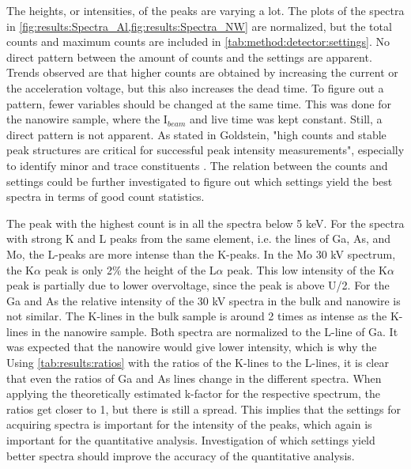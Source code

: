 The heights, or intensities, of the peaks are varying a lot.
The plots of the spectra in \cref{fig:results:Spectra_Al,fig:results:Spectra_NW} are normalized, but the total counts and maximum counts are included in \cref{tab:method:detector:settings}.
No direct pattern between the amount of counts and the settings are apparent.
Trends observed are that higher counts are obtained by increasing the current or the acceleration voltage, but this also increases the dead time.
To figure out a pattern, fewer variables should be changed at the same time.
This was done for the nanowire sample, where the I$_{beam}$ and live time was kept constant.
Still, a direct pattern is not apparent.
As stated in Goldstein, "high counts and stable peak structures are critical for successful peak intensity measurements", especially to identify minor and trace constituents \cite[page 318]{goldstein_scanning_2018}.
The relation between the counts and settings could be further investigated to figure out which settings yield the best spectra in terms of good count statistics.

The peak with the highest count is in all the spectra below 5 keV.
For the spectra with strong K and L peaks from the same element, i.e. the lines of Ga, As, and Mo, the L-peaks are more intense than the K-peaks.
In the Mo 30 kV spectrum, the K$\alpha$ peak is only 2\% the height of the L$\alpha$ peak.
This low intensity of the K$\alpha$ peak is partially due to lower overvoltage, since the peak is above U/2.
For the Ga and As the relative intensity of the 30 kV spectra in the bulk and nanowire is not similar.
The K-lines in the bulk sample is around 2 times as intense as the K-lines in the nanowire sample.
Both spectra are normalized to the L-line of Ga.
It was expected that the nanowire would give lower intensity, which is why the
Using \cref{tab:results:ratios} with the ratios of the K-lines to the L-lines, it is clear that even the ratios of Ga and As lines change in the different spectra.
When applying the theoretically estimated k-factor for the respective spectrum, the ratios get closer to 1, but there is still a spread.
This implies that the settings for acquiring spectra is important for the intensity of the peaks, which again is important for the quantitative analysis.
Investigation of which settings yield better spectra should improve the accuracy of the quantitative analysis.


